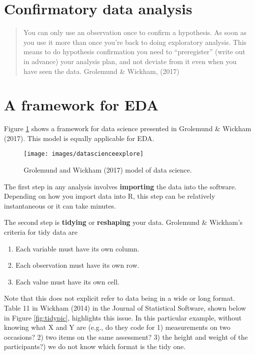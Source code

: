 \documentclass[]{book}
\providecommand{\tightlist}{%
  \setlength{\itemsep}{0pt}\setlength{\parskip}{0pt}}
\begin{document}
\hypertarget{confirmatory-data-analysis}{%
\section{Confirmatory data analysis}\label{confirmatory-data-analysis}}

\begin{quote}
You can only use an observation once to confirm a hypothesis. As soon as you use it more than once you're back to doing exploratory analysis. This means to do hypothesis confirmation you need to ``preregister'' (write out in advance) your analysis plan, and not deviate from it even when you have seen the data. Grolemund \& Wickham, (2017)
\end{quote}

\hypertarget{a-framework-for-eda}{%
\section{A framework for EDA}\label{a-framework-for-eda}}

Figure \ref{fig:edamod} shows a framework for data science presented in Grolemund \& Wickham (2017). This model is equally applicable for EDA.

\begin{figure}
\texttt{[image: images/datascienceexplore]} \caption{Grolemund and Wickham (2017) model of data science.}\label{fig:edamod}
\end{figure}

The first step in any analysis involves \textbf{importing} the data into the software. Depending on how you import data into R, this step can be relatively instantaneous or it can take minutes.

The second step is \textbf{tidying} or \textbf{reshaping} your data. Grolemund \& Wickham's criteria for tidy data are

\begin{enumerate}
\def\labelenumi{\arabic{enumi}.}
\tightlist
\item
  Each variable must have its own column.
\item
  Each observation must have its own row.
\item
  Each value must have its own cell.
\end{enumerate}

Note that this does not explicit refer to data being in a wide or long format. Table 11 in Wickham (2014) in the Journal of Statistical Software, shown below in Figure \ref{fig:tidypic}, highlights this issue. In this particular example, without knowing what X and Y are (e.g., do they code for 1) measurements on two occasions? 2) two items on the same assessment? 3) the height and weight of the participants?) we do not know which format is the tidy one.
\end{document}
